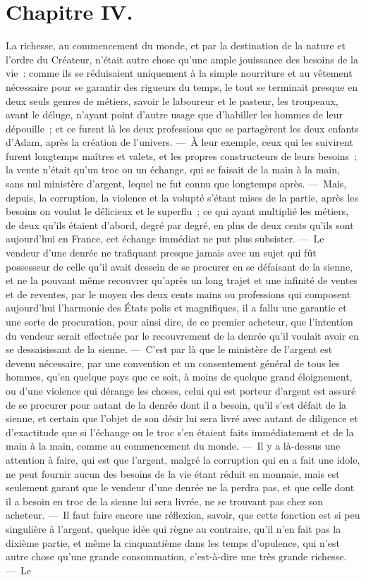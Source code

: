 \documentclass[french,twoside]{book} %
\begin{document}
\section[{Chapitre IV.}]{Chapitre IV.}
\noindent La richesse, au commencement du monde, et par la destination de la nature et l’ordre du Créateur, n’était autre chose qu’une ample jouissance des besoins de la vie : comme ils se réduisaient uniquement à la simple nourriture et au vêtement nécessaire pour se garantir des rigueurs du temps, le tout se terminait presque en deux seuls genres de métiers, savoir le laboureur et le pasteur, les troupeaux, avant le déluge, n’ayant point d’autre usage que d’habiller les hommes de leur dépouille ; et ce furent là les deux professions que se partagèrent les deux enfants d’Adam, après la création de l’univers. — À leur exemple, ceux qui les suivirent furent longtemps maîtres et valets, et les propres constructeurs de leurs besoins ; la vente n’était qu’un troc ou un échange, qui se faisait de la main à la main, sans nul ministère d’argent, lequel ne fut connu que longtemps après. — Mais, depuis, la corruption, la violence et la volupté s’étant mises de la partie, après les besoins on voulut le délicieux et le superflu ; ce qui ayant multiplié les métiers, de deux qu’ils étaient d’abord, degré par degré, en plus de deux cents qu’ils sont aujourd’hui en France, cet échange immédiat ne put plus subsister. — Le vendeur d’une denrée ne trafiquant presque jamais avec un sujet qui fût possesseur de celle qu’il avait dessein de se procurer en se défaisant de la sienne, et ne la pouvant même recouvrer qu’après un long trajet et une infinité de ventes et de reventes, par le moyen des deux cents mains ou professions qui composent aujourd’hui l’harmonie des États polis et magnifiques, il a fallu une garantie et une sorte de procuration, pour ainsi dire, de ce premier acheteur, que l’intention du vendeur serait effectuée par le recouvrement de la denrée qu’il voulait avoir en se dessaisissant de la sienne. — C’est par là que le ministère de l’argent est devenu nécessaire, par une convention et un consentement général de tous les hommes, qu’en quelque pays que ce soit, à moins de quelque grand éloignement, ou d’une violence qui dérange les choses, celui qui est porteur d’argent est assuré de se procurer pour autant de la denrée dont il a besoin, qu’il s’est défait de la sienne, et certain que l’objet de son désir lui sera livré avec autant de diligence et d’exactitude que si l’échange ou le troc s’en étaient faits immédiatement et de la main à la main, comme au commencement du monde. — Il y a là-dessus une attention à faire, qui est que l’argent, malgré la corruption qui en a fait une idole, ne peut fournir aucun des besoins de la vie étant réduit en monnaie, mais est seulement garant que le vendeur d’une denrée ne la perdra pas, et que celle dont il a besoin en troc de la sienne lui sera livrée, ne se trouvant pas chez son acheteur. — Il faut faire encore une réflexion, savoir, que cette fonction est si peu singulière à l’argent, quelque idée qui règne au contraire, qu’il n’en fait pas la dixième partie, et même la cinquantième dans les temps d’opulence, qui n’est autre chose qu’une grande consommation, c’est-à-dire une très grande richesse. — Le 
\end{document}
